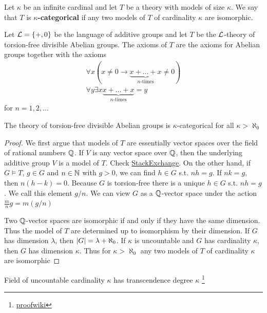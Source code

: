 \documentclass[11pt]{article}
\begin{document}
\begin{definition}[]
Let \(\kappa\) be an infinite cardinal and let \(T\) be a theory with models of
size \(\kappa\). We say that \(T\) is \textbf{\(\kappa\)-categorical} if any two models of
\(T\) of cardinality \(\kappa\) are isomorphic.
\end{definition}

Let \(\mathcal{L}=\{+,0\}\) be the language of additive groups and let \(T\) be the
\(\mathcal{L}\)-theory of torsion-free divisible Abelian groups. The axioms of \(T\)
are the axioms for Abelian groups together with the axioms
\begin{gather*}
\forall x(x\neq 0\to\underbrace{x+\dots+x}_{n\text{-times}}\neq 0)\\
\forall y\exists x\underbrace{x+\dots+x}_{n\text{-times}}=y
\end{gather*}
for \(n=1,2,\dots\)


\begin{proposition}[]
\label{prop2.2.4}
The theory of torsion-free divisible Abelian groups is \(\kappa\)-categorical for
all \(\kappa>\aleph_0\)
\end{proposition}

\begin{proof}
We first argue that models of \(T\) are essentially vector spaces over the
field of rational numbers \(\mathbb{Q}\). If \(V\) is any vector space over \(\mathbb{Q}\), then
the underlying additive group \(V\) is a model of \(T\). 
Check \href{https://math.stackexchange.com/questions/1550900/necessary-and-sufficient-conditions-for-an-abelian-group-to-be-a-vector-space-ov/1550954}{StackExchange}.
On the other hand, if
\(G\vDash T\), \(g\in G\) and \(n\in\mathbb{N}\) with \(g>0\), we can find 
\(h\in G\) s.t. \(nh=g\). If \(nk=g\), then \(n(h-k)=0\). Because \(G\) is
torsion-free there is a unique \(h\in G\) s.t. \(nh=g\). We call this element 
\(g/n\). We can view \(G\) as a \(\mathbb{Q}\)-vector space under the action
\(\frac{m}{n}g=m(g/n)\)

Two \(\mathbb{Q}\)-vector spaces are isomorphic if and only if they have the same
dimension. Thus the model of \(T\) are determined up to isomorphism by their
dimension. If \(G\) has dimension \(\lambda\), then \(\abs{G}=\lambda+\aleph_0\). If \(\kappa\)
is uncountable and \(G\) has cardinality \(\kappa\), then \(G\) has dimension \(\kappa\). Thus for
\(\kappa>\aleph_0\) any two models of \(T\) of cardinality \(\kappa\) are isomorphic
\end{proof}

\begin{lemma}[]
\label{lemmamy1}
Field of uncountable cardinality \(\kappa\) has transcendence degree \(\kappa\)
\footnote{\href{https://proofwiki.org/wiki/Field\_of\_Uncountable\_Cardinality\_K\_has\_Transcendence\_Degree\_K}{proofwiki}}
\end{lemma}
\end{document}
